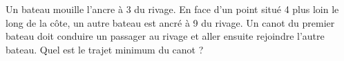 \begin{exercice}\label{exoGeneral0016}

Un bateau mouille l'ancre à \unit{3}{\kilo\meter} du rivage. En face d'un point situé \unit{4}{\kilo\meter} plus loin le long de la côte, un autre bateau est ancré à \unit{9}{\kilo\meter} du rivage. Un canot du premier bateau doit conduire un passager au rivage et aller ensuite rejoindre l'autre bateau. Quel est le trajet minimum du canot ?

\end{exercice}
